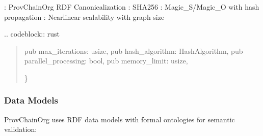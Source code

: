 \documentclass[letterpaper,10pt,english]{sphinxmanual}
\begin{document}
\sphinxAtStartPar
{}
\sphinxhyphen{} : ProvChainOrg RDF Canonicalization
\sphinxhyphen{} : SHA\sphinxhyphen{}256
\sphinxhyphen{} : Magic\_S/Magic\_O with hash propagation
\sphinxhyphen{} : Near\sphinxhyphen{}linear scalability with graph size

\sphinxAtStartPar
{}
.. code\sphinxhyphen{}block:: rust
\begin{quote}
\begin{description}
\sphinxAtStartPar
pub max\_iterations: usize,
pub hash\_algorithm: HashAlgorithm,
pub parallel\_processing: bool,
pub memory\_limit: usize,

\end{description}

\sphinxAtStartPar
\}
\end{quote}


\subsubsection{Data Models}
\label{\detokenize{research/technical-specifications:data-models}}
\sphinxAtStartPar
ProvChainOrg uses RDF data models with formal ontologies for semantic validation:
\end{document}
